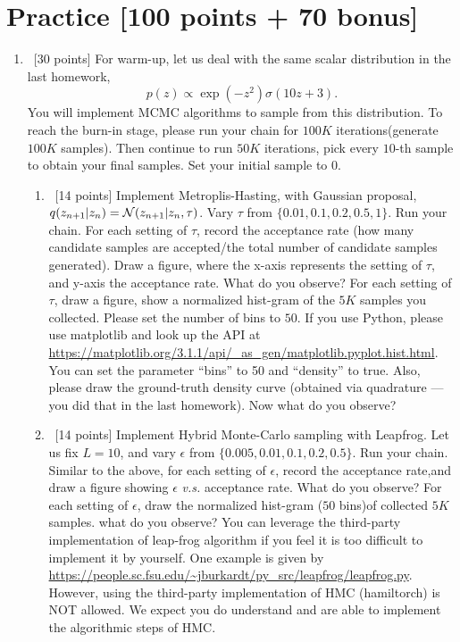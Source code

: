 \documentclass[12pt, fullpage,letterpaper]{article}
\begin{document}
\section*{Practice  [100 points + 70 bonus]}	
\label{sec:q1}
\begin{enumerate}
	\item~[30 points] For warm-up, let us deal with the same scalar distribution in the last homework, 
	\[
	p(z) \propto \exp(-z^2)\sigma(10z + 3).
	\]
	You will implement MCMC algorithms to sample from this distribution. To reach the burn-in stage, please run your chain for $100K$ iterations(\ie generate $100K$ samples). Then continue to run $50K$ iterations, pick every $10$-th sample to obtain your final samples.  Set your initial sample to $0$.
	\begin{enumerate}
		\item~[14 points] Implement Metroplis-Hasting, with Gaussian proposal, $q(z_{n+1}|z_n) = \mathcal{N}(z_{n+1}|z_{n}, \tau)$. Vary $\tau$ from $\{0.01, 0.1, 0.2, 0.5, 1\}$. Run your chain. For each setting of $\tau$, record the acceptance rate (\ie how many candidate samples are accepted/the total number of candidate samples generated). Draw a figure, where the x-axis represents the setting of $\tau$, and y-axis the acceptance rate. What do you observe?
		For each setting of $\tau$, draw a figure, show a normalized hist-gram of the $5K$ samples you collected. Please set the number of bins to $50$. If you use Python, please use matplotlib and look up the API at \url{https://matplotlib.org/3.1.1/api/_as_gen/matplotlib.pyplot.hist.html}. You can set the parameter ``bins'' to 50 and ``density'' to true. Also, please draw the ground-truth density curve (obtained via quadrature --- you did that in the last homework). Now what do you observe?
		
		\item~[14 points] Implement Hybrid Monte-Carlo sampling with Leapfrog. Let us fix $L = 10$, and vary $\epsilon$ from $\{0.005, 0.01, 0.1, 0.2, 0.5\}$. Run your chain. Similar to the above, for each setting of $\epsilon$, record the acceptance rate,and draw a figure showing $\epsilon$ \textit{v.s.} acceptance rate. What do you observe? For each setting of $\epsilon$, draw the normalized hist-gram ($50$ bins)of collected $5K$ samples. what do you observe? You can leverage the third-party implementation of leap-frog algorithm if you feel it is too difficult to implement it by yourself. One example is given by \url{https://people.sc.fsu.edu/~jburkardt/py_src/leapfrog/leapfrog.py}. However, using the third-party implementation of HMC (\eg hamiltorch) is NOT allowed. We expect you do understand and are able to implement the algorithmic steps of HMC. 
		

\end{enumerate}
\end{enumerate}
\end{document}
